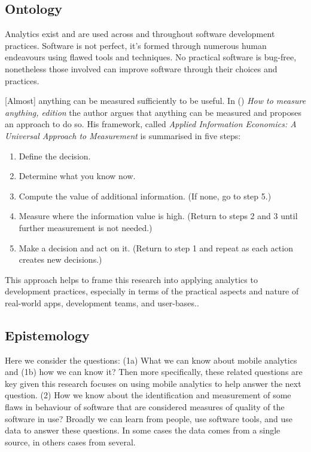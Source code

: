 \subsection{Ontology}
Analytics exist and are used across and throughout software development practices. Software is not perfect, it's formed through numerous human endeavours using flawed tools and techniques. No practical software is bug-free, nonetheless those involved can improve software through their choices and practices.

[Almost] anything can be measured sufficiently to be useful. In (\cite{hubbard2014measure}) \emph{How to measure anything,  edition} the author argues that anything can be measured and proposes an approach to do so. His framework, called \emph{Applied Information Economics: A Universal Approach to Measurement} is summarised in five steps:

\begin{enumerate}
    \item Define the decision.
    \item Determine what you know now.
    \item Compute the value of additional information. (If none, go to step 5.)
    \item Measure where the information value is high. (Return to steps 2 and 3 until further measurement is not needed.)
    \item Make a decision and act on it. (Return to step 1 and repeat as each action creates new decisions.)
\end{enumerate} %

This approach helps to frame this research into applying analytics to development practices, especially in terms of the practical aspects and nature of real-world apps, development teams, and user-bases..

\subsection{Epistemology}
Here we consider the questions: (1a) What we can know about mobile analytics and (1b) how we can know it? Then more specifically, these related questions are key given this research focuses on using mobile analytics to help answer the next question. (2) How we know about the identification and measurement of some flaws in behaviour of software that are considered measures of quality of the software in use? Broadly we can learn from people, use software tools, and use data to answer these questions. In some cases the data comes from a single source, in others cases from several.

